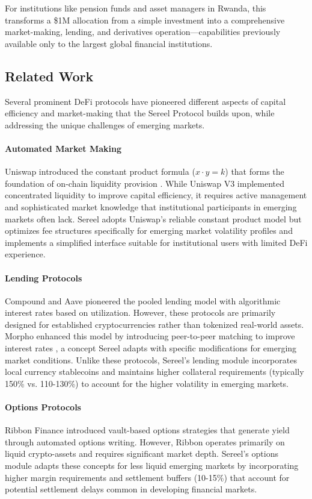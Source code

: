 \documentclass[12pt]{article}
\begin{document}
For institutions like pension funds and asset managers in Rwanda, this transforms a \$1M allocation from a simple investment into a comprehensive market-making, lending, and derivatives operation—capabilities previously available only to the largest global financial institutions.

\subsection{Related Work}

Several prominent DeFi protocols have pioneered different aspects of capital efficiency and market-making that the Sereel Protocol builds upon, while addressing the unique challenges of emerging markets.

\paragraph{Automated Market Making}
Uniswap introduced the constant product formula ($x \cdot y = k$) that forms the foundation of on-chain liquidity provision \citep{uniswapv4whitepaper}. While Uniswap V3 implemented concentrated liquidity to improve capital efficiency, it requires active management and sophisticated market knowledge that institutional participants in emerging markets often lack. Sereel adopts Uniswap's reliable constant product model but optimizes fee structures specifically for emerging market volatility profiles and implements a simplified interface suitable for institutional users with limited DeFi experience.

\paragraph{Lending Protocols}
Compound \citep{compound2019whitepaper} and Aave \citep{aave2020whitepaper} pioneered the pooled lending model with algorithmic interest rates based on utilization. However, these protocols are primarily designed for established cryptocurrencies rather than tokenized real-world assets. Morpho enhanced this model by introducing peer-to-peer matching to improve interest rates \citep{morphoblue2023whitepaper}, a concept Sereel adapts with specific modifications for emerging market conditions. Unlike these protocols, Sereel's lending module incorporates local currency stablecoins and maintains higher collateral requirements (typically 150\% vs. 110-130\%) to account for the higher volatility in emerging markets.

\paragraph{Options Protocols}
Ribbon Finance introduced vault-based options strategies that generate yield through automated options writing. However, Ribbon operates primarily on liquid crypto-assets and requires significant market depth. Sereel's options module adapts these concepts for less liquid emerging markets by incorporating higher margin requirements and settlement buffers (10-15\%) that account for potential settlement delays common in developing financial markets.
\end{document}

